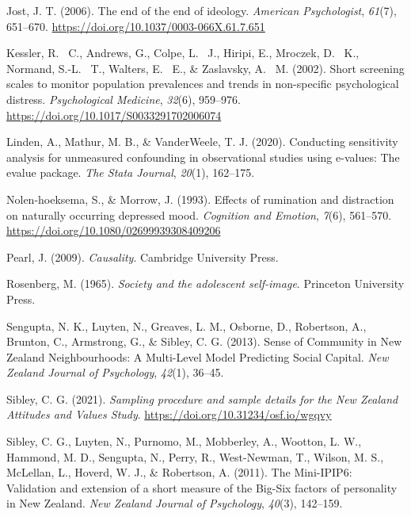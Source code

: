 \documentclass[
  single column]{article}
\newlength{\cslhangindent}
\newenvironment{CSLReferences}[2] %
 {\begin{list}{}{%
  \setlength{\itemindent}{0pt}
  \setlength{\leftmargin}{0pt}
  \setlength{\parsep}{0pt}
  \ifodd #1
   \setlength{\leftmargin}{\cslhangindent}
   \setlength{\itemindent}{-1\cslhangindent}
  \fi
  \setlength{\itemsep}{#2\baselineskip}}}
 {\end{list}}
\begin{document}
\begin{CSLReferences}{1}{0}
Jost, J. T. (2006). The end of the end of ideology. \emph{American
Psychologist}, \emph{61}(7), 651--670.
\url{https://doi.org/10.1037/0003-066X.61.7.651}

Kessler, R. ~C., Andrews, G., Colpe, L. ~J., Hiripi, E., Mroczek, D.
~K., Normand, S.-L. ~T., Walters, E. ~E., \& Zaslavsky, A. ~M. (2002).
Short screening scales to monitor population prevalences and trends in
non-specific psychological distress. \emph{Psychological Medicine},
\emph{32}(6), 959--976. \url{https://doi.org/10.1017/S0033291702006074}

Linden, A., Mathur, M. B., \& VanderWeele, T. J. (2020). Conducting
sensitivity analysis for unmeasured confounding in observational studies
using e-values: The evalue package. \emph{The Stata Journal},
\emph{20}(1), 162--175.

Nolen-hoeksema, S., \& Morrow, J. (1993). Effects of rumination and
distraction on naturally occurring depressed mood. \emph{Cognition and
Emotion}, \emph{7}(6), 561--570.
\url{https://doi.org/10.1080/02699939308409206}

Pearl, J. (2009). \emph{Causality}. Cambridge University Press.

Rosenberg, M. (1965). \emph{Society and the adolescent self-image}.
Princeton University Press.

Sengupta, N. K., Luyten, N., Greaves, L. M., Osborne, D., Robertson, A.,
Brunton, C., Armstrong, G., \& Sibley, C. G. (2013). Sense of Community
in {N}ew {Z}ealand Neighbourhoods: A Multi-Level Model Predicting Social
Capital. \emph{New Zealand Journal of Psychology}, \emph{42}(1), 36--45.

Sibley, C. G. (2021). \emph{Sampling procedure and sample details for
the {N}ew {Z}ealand {A}ttitudes and {V}alues {S}tudy}.
\url{https://doi.org/10.31234/osf.io/wgqvy}

Sibley, C. G., Luyten, N., Purnomo, M., Mobberley, A., Wootton, L. W.,
Hammond, M. D., Sengupta, N., Perry, R., West-Newman, T., Wilson, M. S.,
McLellan, L., Hoverd, W. J., \& Robertson, A. (2011). The Mini-IPIP6:
Validation and extension of a short measure of the Big-Six factors of
personality in {N}ew {Z}ealand. \emph{New Zealand Journal of
Psychology}, \emph{40}(3), 142--159.


\end{CSLReferences}
\end{document}
